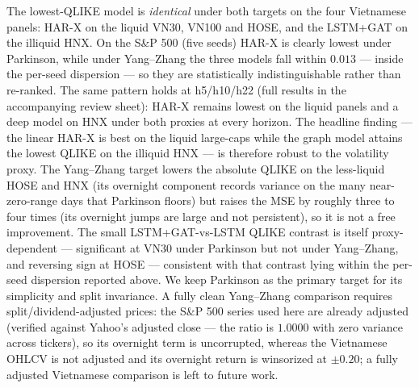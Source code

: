\documentclass[runningheads]{llncs}
\begin{document}
The lowest-QLIKE model is \emph{identical} under both targets on the four Vietnamese panels: HAR-X on the
liquid VN30, VN100 and HOSE, and the LSTM+GAT on the illiquid HNX. On the S\&P 500 (five seeds) HAR-X is
clearly lowest under Parkinson, while under Yang--Zhang the three models fall within $0.013$ --- inside the
per-seed dispersion --- so they are statistically indistinguishable rather than re-ranked. The same pattern holds at h5/h10/h22 (full results in the accompanying review sheet): HAR-X remains lowest on the liquid panels and a deep model on HNX under both proxies at every horizon. The headline finding --- the linear HAR-X is best on the
liquid large-caps while the graph model attains the lowest QLIKE on the illiquid HNX --- is therefore robust to
the volatility proxy. The Yang--Zhang target lowers the absolute QLIKE on the less-liquid HOSE and HNX (its
overnight component records variance on the many near-zero-range days that Parkinson floors) but raises the MSE
by roughly three to four times (its overnight jumps are large and not persistent), so it is not a free
improvement. The small LSTM+GAT-vs-LSTM QLIKE contrast is itself proxy-dependent --- significant at VN30 under
Parkinson but not under Yang--Zhang, and reversing sign at HOSE --- consistent with that contrast lying within
the per-seed dispersion reported above. We keep Parkinson as the primary target for its simplicity and split
invariance. A fully clean Yang--Zhang comparison requires split/dividend-adjusted prices: the S\&P 500 series
used here are already adjusted (verified against Yahoo's adjusted close --- the ratio is $1.0000$ with zero
variance across tickers), so its overnight term is uncorrupted, whereas the Vietnamese OHLCV is not adjusted
and its overnight return is winsorized at $\pm0.20$; a fully adjusted Vietnamese comparison is left to future
work.
\end{document}
